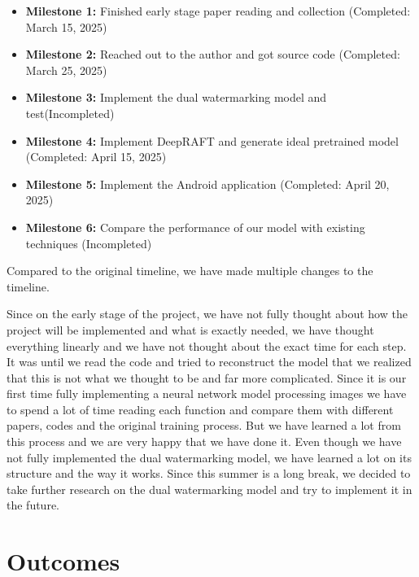 \documentclass[acmsmall, nonacm]{acmart}
\begin{document}
\begin{itemize}
  \item \textbf{Milestone 1:} Finished early stage paper reading and collection (Completed: March 15, 2025)
  \item \textbf{Milestone 2:} Reached out to the author and got source code (Completed: March 25, 2025)
  \item \textbf{Milestone 3:} Implement the dual watermarking model and test(Incompleted)
  \item \textbf{Milestone 4:} Implement DeepRAFT and generate ideal pretrained model (Completed: April 15, 2025)
  \item \textbf{Milestone 5:} Implement the Android application (Completed: April 20, 2025)
  \item \textbf{Milestone 6:} Compare the performance of our model with existing techniques (Incompleted)
\end{itemize}

Compared to the original timeline, we have made multiple changes to the timeline.

Since on the early stage of the project, we have not fully thought about how the project will be implemented and what is exactly needed, we have thought everything linearly and we have not thought about the exact time for each step.
It was until we read the code and tried to reconstruct the model that we realized that this is not what we thought to be and far more complicated.
Since it is our first time fully implementing a neural network model processing images we have to spend a lot of time reading each function and compare them with different papers, codes and the original training process.
But we have learned a lot from this process and we are very happy that we have done it.
Even though we have not fully implemented the dual watermarking model, we have learned a lot on its structure and the way it works.
Since this summer is a long break, we decided to take further research on the dual watermarking model and try to implement it in the future.


\section{Outcomes}\label{sec:outcomes}


\end{document}
